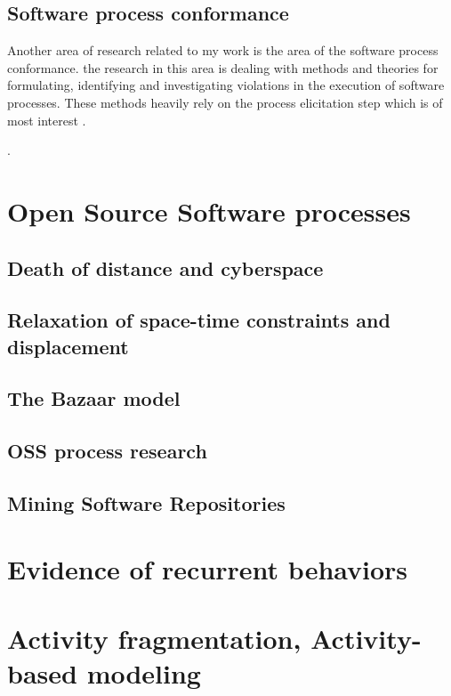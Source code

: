 \subsection{Software process conformance}
Another area of research related to my work is the area of the software process conformance. 
the research in this area is dealing with methods and theories for formulating, identifying and
investigating violations in the execution of software processes. These methods heavily rely
on the process elicitation step which is of most interest . 

.

\section{Open Source Software processes}\label{oss.processes}

\subsection{Death of distance and cyberspace}
\subsection{Relaxation of space-time constraints and displacement}
\subsection{The Bazaar model}
\subsection{OSS process research}
\subsection{Mining Software Repositories}\label{background.msr.summary}


\section{Evidence of recurrent behaviors}

\section{Activity fragmentation, Activity-based modeling}\label{activity}

